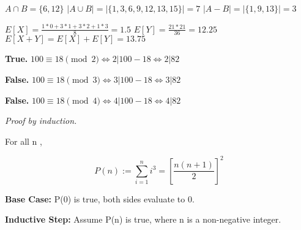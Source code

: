 \documentclass[12pt,twoside]{article}
\begin{document}

\begin{problems}

\problem  %

\begin{problemparts}


\problempart \( A \cap B = \{ 6, 12 \}\) %
\problempart \( |A \cup B| = | \{ 1,3,6,9,12,13,15 \} | = 7\) %
\problempart \( |A - B| = |\{1,9,13\}| = 3\) %

\end{problemparts}

\problem  %

\begin{problemparts}
\problempart \(E[X] = \frac{1*0 + 3*1 + 3*2 + 1*3}{8} = 1.5 \)%
\problempart \( E[Y] = \frac{21*21}{36} = 12.25 \) %
\problempart \( E[X+Y] = E[X] + E[Y] = 13.75\) %
\end{problemparts}

\problem  %

\begin{problemparts}
\problempart \textbf{True. }\( 100 \equiv 18 \pmod{2} \iff 2 \vert 100-18 \iff 2 \vert 82\) %

\problempart \textbf{False. }\( 100 \equiv 18 \pmod{3} \iff 3 \vert 100-18 \iff 3 \vert 82\)%

\problempart \textbf{False. }\( 100 \equiv 18 \pmod{4} \iff 4 \vert 100-18 \iff 4 \vert 82\)%
\end{problemparts}

\problem  %

\textit{Proof by induction.}

For all n  \in {},

\[ P(n) := \sum_{i=1}^n{i^3} = \left[ \frac{n(n+1)}{2} \right]^2 \]

\textbf{Base Case:} P(0) is true, both sides evaluate to 0.

\textbf{Inductive Step:} Assume P(n) is true, where n is a non-negative integer.


\end{problems}
\end{document}
